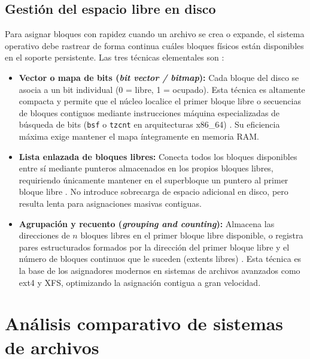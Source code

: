 \documentclass[12pt]{article}
\begin{document}
\subsection{Gestión del espacio libre en disco}
\label{subsec:gestionEspacioLibre}

Para asignar bloques con rapidez cuando un archivo se crea o expande, el sistema operativo debe rastrear de forma continua cuáles bloques físicos están disponibles en el soporte persistente. Las tres técnicas elementales son \parencite[\S 11.5, pp.\ 388--391]{silberschatz2006fundamentos}:

\begin{itemize}[noitemsep, topsep=2pt]
    \item \textbf{Vector o mapa de bits (\textit{bit vector / bitmap}):} Cada bloque del disco se asocia a un bit individual (0 = libre, 1 = ocupado). Esta técnica es altamente compacta y permite que el núcleo localice el primer bloque libre o secuencias de bloques contiguos mediante instrucciones máquina especializadas de búsqueda de bits (\texttt{bsf} o \texttt{tzcnt} en arquitecturas x86\_64) \parencite[\S 11.5.1, p.\ 388]{silberschatz2006fundamentos}. Su eficiencia máxima exige mantener el mapa íntegramente en memoria RAM.
    \item \textbf{Lista enlazada de bloques libres:} Conecta todos los bloques disponibles entre sí mediante punteros almacenados en los propios bloques libres, requiriendo únicamente mantener en el superbloque un puntero al primer bloque libre \parencite[\S 11.5.2, p.\ 389]{silberschatz2006fundamentos}. No introduce sobrecarga de espacio adicional en disco, pero resulta lenta para asignaciones masivas contiguas.
    \item \textbf{Agrupación y recuento (\textit{grouping and counting}):} Almacena las direcciones de $n$ bloques libres en el primer bloque libre disponible, o registra pares estructurados formados por la dirección del primer bloque libre y el número de bloques continuos que le suceden (extents libres) \parencite[\S 11.5.3, p.\ 390]{silberschatz2006fundamentos}. Esta técnica es la base de los asignadores modernos en sistemas de archivos avanzados como ext4 y XFS, optimizando la asignación contigua a gran velocidad.
\end{itemize}

\section{Análisis comparativo de sistemas de archivos}
\label{sec:analisisComparativoSistemasArchivos}
\end{document}
